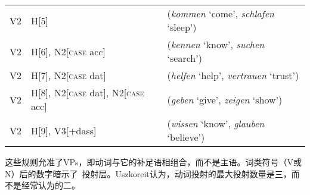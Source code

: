 \ea
\label{gpsg-regeln}
\begin{tabular}[t]{@{}l@{~$\to$~}ll@{}}
V2  & H[5]                                    & (\emph{kommen} `come', \emph{schlafen} `sleep')\\
V2  & H[6], N2[\textsc{case} acc]                & (\emph{kennen} `know', \emph{suchen} `search')\\
V2  & H[7], N2[\textsc{case} dat]                & (\emph{helfen} `help', \emph{vertrauen} `trust')\\
V2  & H[8], N2[\textsc{case} dat], N2[\textsc{case} acc]  & (\emph{geben} `give', \emph{zeigen} `show')\\
V2  & H[9], V3[+dass]                         & (\emph{wissen} `know', \emph{glauben} `believe')\\
\end{tabular}
\z
%
这些规则允准了VPs，即动词与它的补足语相组合，而不是主语。词类符号（V或N）后的数字暗示了\xbar~投射层。Uszkoreit认为，动词投射的最大投射数量是三，而不是经常认为的二。

